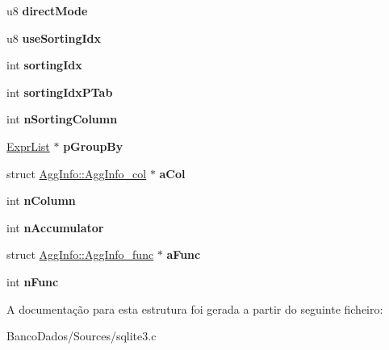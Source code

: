 \begin{DoxyCompactItemize}
\item 
\hypertarget{struct_agg_info_aaa57d294016ac7e17e7cacaa7b25634e}{u8 {\bfseries direct\-Mode}}\label{struct_agg_info_aaa57d294016ac7e17e7cacaa7b25634e}

\item 
\hypertarget{struct_agg_info_a8173a7ea13c4a12ce4befbcb40719073}{u8 {\bfseries use\-Sorting\-Idx}}\label{struct_agg_info_a8173a7ea13c4a12ce4befbcb40719073}

\item 
\hypertarget{struct_agg_info_a97ce74f509ca908a616c123e7196797b}{int {\bfseries sorting\-Idx}}\label{struct_agg_info_a97ce74f509ca908a616c123e7196797b}

\item 
\hypertarget{struct_agg_info_a7faac4c3996598960fc46f0c173b244c}{int {\bfseries sorting\-Idx\-P\-Tab}}\label{struct_agg_info_a7faac4c3996598960fc46f0c173b244c}

\item 
\hypertarget{struct_agg_info_a89925dccd1a0ec51d2a5a5dbaead66dc}{int {\bfseries n\-Sorting\-Column}}\label{struct_agg_info_a89925dccd1a0ec51d2a5a5dbaead66dc}

\item 
\hypertarget{struct_agg_info_aa8e942103d224c4db847743670907781}{\hyperlink{struct_expr_list}{Expr\-List} $\ast$ {\bfseries p\-Group\-By}}\label{struct_agg_info_aa8e942103d224c4db847743670907781}

\item 
\hypertarget{struct_agg_info_a52fa1a7eb3145c27be13b2bcccd57d62}{struct \hyperlink{struct_agg_info_1_1_agg_info__col}{Agg\-Info\-::\-Agg\-Info\-\_\-col} $\ast$ {\bfseries a\-Col}}\label{struct_agg_info_a52fa1a7eb3145c27be13b2bcccd57d62}

\item 
\hypertarget{struct_agg_info_a9cbfa5fc33328cf3500426674e036a8b}{int {\bfseries n\-Column}}\label{struct_agg_info_a9cbfa5fc33328cf3500426674e036a8b}

\item 
\hypertarget{struct_agg_info_ad2251760d95af9024f0a3170405cb53b}{int {\bfseries n\-Accumulator}}\label{struct_agg_info_ad2251760d95af9024f0a3170405cb53b}

\item 
\hypertarget{struct_agg_info_a4e201acd6a1f8aed360c58e45f47c803}{struct \hyperlink{struct_agg_info_1_1_agg_info__func}{Agg\-Info\-::\-Agg\-Info\-\_\-func} $\ast$ {\bfseries a\-Func}}\label{struct_agg_info_a4e201acd6a1f8aed360c58e45f47c803}

\item 
\hypertarget{struct_agg_info_a5bfde7ca00d28da6edbda523ab038e38}{int {\bfseries n\-Func}}\label{struct_agg_info_a5bfde7ca00d28da6edbda523ab038e38}

\end{DoxyCompactItemize}


A documentação para esta estrutura foi gerada a partir do seguinte ficheiro\-:\begin{DoxyCompactItemize}
\item 
Banco\-Dados/\-Sources/sqlite3.\-c\end{DoxyCompactItemize}

